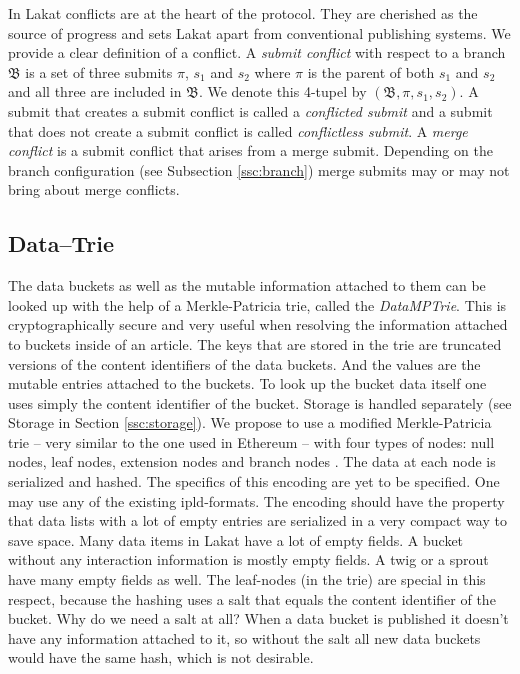\documentclass[14pt]{article}
\begin{document}
In Lakat conflicts are at the heart of the protocol. They are cherished as the source of progress and sets Lakat apart from conventional publishing systems. We provide a clear definition of a conflict. A \textit{submit conflict} with respect to a branch $\mathfrak B$ is a set 
of three submits $\pi$, $s_1$ and $s_2$ where $\pi$ is the parent of both $s_1$ and $s_2$ and all three are included in $\mathfrak B$. We denote this 4-tupel by $(\mathfrak B, \pi, s_1, s_2)$.
A submit that creates a submit conflict is called a \textit{conflicted submit} and a submit that does not create a submit conflict is called \textit{conflictless submit}.
A \textit{merge conflict} is a submit conflict that arises from a merge submit. Depending on the branch configuration (see Subsection \ref{ssc:branch}) merge submits may or may not bring about merge conflicts. 


\subsection{Data--Trie}
\label{ssc:datatrie}

The data buckets as well as the mutable information attached to them can be looked up with the help of a Merkle-Patricia trie, called the \textit{DataMPTrie}. This is cryptographically secure and very useful when resolving the information attached to buckets inside of an article. The keys that are stored in the trie are truncated versions of the content identifiers of the data buckets. And the values are the mutable entries attached to the buckets. To look up the bucket data itself one uses simply the content identifier of the bucket. Storage is handled separately (see Storage in Section \ref{ssc:storage}).
We propose to use a modified Merkle-Patricia trie -- very similar to the one used in Ethereum -- with four types of nodes: null nodes, leaf nodes, extension nodes and branch nodes \cite{}.
The data at each node is serialized and hashed. The specifics of this encoding are yet to be specified. One may use any of the existing ipld-formats. The encoding should have the property that data lists with a lot of empty entries are serialized in a very compact way to save space. Many data items in Lakat have a lot of empty fields. A bucket without any interaction information is mostly empty fields. A twig or a sprout have many empty fields as well. The leaf-nodes (in the trie) are special in this respect, because the hashing uses a salt that equals the content identifier of the bucket. Why do we need a salt at all? When a data bucket is published it doesn't have any information attached to it, so without the salt all new data buckets would have the same hash, which is not desirable.
\end{document}
